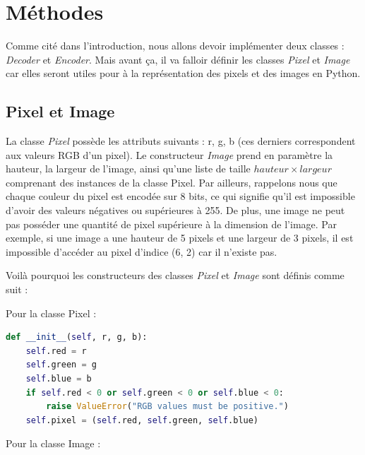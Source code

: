 \documentclass[utf8]{article}
\begin{document}
\section{Méthodes}
Comme cité dans l'introduction, nous allons devoir implémenter deux classes : \textit{Decoder} et \textit{Encoder}. Mais avant ça, il va falloir définir les classes \textit{Pixel} et \textit{Image} car elles seront utiles pour à la représentation des pixels et des images en Python.
\subsection{Pixel et Image}
La classe \textit{Pixel} possède les attributs suivants : r, g, b (ces derniers correspondent aux valeurs RGB d'un pixel). 
Le constructeur \textit{Image} prend en paramètre la hauteur, la largeur de l'image, ainsi qu'une liste de taille $hauteur \times largeur$ comprenant des instances de la classe Pixel.
Par ailleurs, rappelons nous que chaque couleur du pixel est encodée sur 8 bits, ce qui signifie qu'il est impossible d'avoir des valeurs négatives ou supérieures à 255. De plus, une image ne peut pas posséder une quantité de pixel supérieure à la dimension de l'image. Par exemple, si une image a une hauteur de 5 pixels et une largeur de 3 pixels, il est impossible d'accéder au pixel d'indice (6, 2) car il n'existe pas.

Voilà pourquoi les constructeurs des classes \textit{Pixel} et \textit{Image} sont définis comme suit :

Pour la classe Pixel : 
\begin{lstlisting}[language=Python, basicstyle=\small]
def __init__(self, r, g, b):
    self.red = r
    self.green = g
    self.blue = b
    if self.red < 0 or self.green < 0 or self.blue < 0:
        raise ValueError("RGB values must be positive.")
    self.pixel = (self.red, self.green, self.blue)
\end{lstlisting}

Pour la classe Image : 
\end{document}
